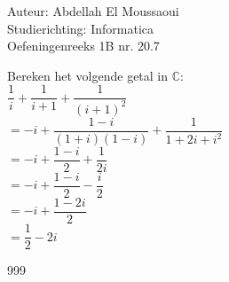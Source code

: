 \documentclass[a4paper]{article}
\begin{document}
  
\noindent \large Auteur: Abdellah El Moussaoui \\
\noindent \large Studierichting: Informatica\\
\noindent \large Oefeningenreeks 1B nr. 20.7\\

\medskip

\normalsize

\medskip

Bereken het volgende getal in $\mathbb{C}$: \\

$\dfrac{1}{i}+\dfrac{1}{i+1}+\dfrac{1}{(i+1)^2}$\\

$=-i+\dfrac{1-i}{(1+i)(1-i)}+\dfrac{1}{1+2i+i^2}$\\

$=-i+\dfrac{1-i}{2}+\dfrac{1}{2i}$\\

$=-i+\dfrac{1-i}{2}-\dfrac{i}{2}$\\

$=-i+\dfrac{1-2i}{2}$\\

$=\dfrac{1}{2}-2i$\\

\begin{thebibliography}{999}
\end{thebibliography}
\end{document}
